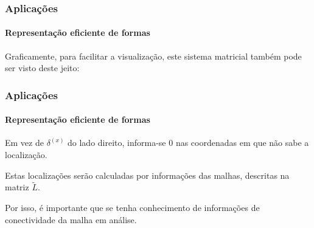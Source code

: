 \begin{frame}
\frametitle{Aplicações}
\framesubtitle{Representação eficiente de formas}

Graficamente, para facilitar a visualização, este sistema matricial também pode ser visto deste jeito:

\begin{center}
\end{center}

\end{frame}


\begin{frame}
\frametitle{Aplicações}
\framesubtitle{Representação eficiente de formas}

Em vez de $\delta^{(x)}$ do lado direito, informa-se $0$ nas coordenadas em que não sabe a localização.

\medskip

Estas localizações serão calculadas por informações das malhas, descritas na matriz $\tilde{L}$.

\medskip

Por isso, é importante que se tenha conhecimento de informações de conectividade da malha em análise.
\end{frame}